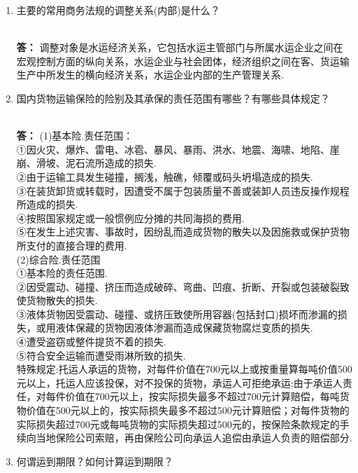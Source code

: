 \documentclass[UTF8]{ctexart}
\date{}
\begin{document}
\thispagestyle{fancy}
\footnotesize
\begin{enumerate}[1]
\item
\begin{CJK}{UTF8}{you}
主要的常用商务法规的调整关系(内部)是什么？
\end{CJK}
\\ \textbf{答：}  调整对象是水运经济关系，它包括水运主管部门与所属水运企业之间在宏观控制方面的纵向关系，水运企业与社会团体，经济组织之间在客、货运输生产中所发生的横向经济关系，水运企业内部的生产管理关系.
\item  \begin{CJK}{UTF8}{you} 国内货物运输保险的险别及其承保的责任范围有哪些？有哪些具体规定？\end{CJK}
\\ \textbf{答：}  (1)基本险.责任范围：
\\ ①因火灾、爆炸、雷电、冰雹、暴风、暴雨、洪水、地震、海啸、地陷、崖崩、滑坡、泥石流所造成的损失.
\\ ②由于运输工具发生碰撞，搁浅，触礁，倾覆或码头坍塌造成的损失.
\\ ③在装货卸货或转载时，因遭受不属于包装质量不善或装卸人员违反操作规程所造成的损失.
\\ ④按照国家规定或一般惯例应分摊的共同海损的费用.
\\ ⑤在发生上述灾害、事故时，因纷乱而造成货物的散失以及因施救或保护货物所支付的直接合理的费用.
\\(2)综合险.责任范围
\\ ①基本险的责任范围.
\\ ②因受震动、碰撞、挤压而造成破碎、弯曲、凹痕、折断、开裂或包装破裂致使货物散失的损失.
\\ ③液体货物因受震动、碰撞、或挤压致使所用容器(包括封口)损坏而渗漏的损失，或用液体保藏的货物因液体渗漏而造成保藏货物腐烂变质的损失.
\\ ④遭受盗窃或整件提货不着的损失.
\\ ⑤符合安全运输而遭受雨淋所致的损失.
\\ 特殊规定:托运人承运的货物，对每件价值在700元以上或按重量算每吨价值500元以上，托运人应该投保，对不投保的货物，承运人可拒绝承运;由于承运人责任，对每件价值在700元以上，按实际损失最多不超过700元计算赔偿，每吨货物价值在500元以上的，按实际损失最多不超过500元计算赔偿；对每件货物的实际损失超过700元或每吨货物的实际损失超过500元的，按保险条款规定的手续向当地保险公司索赔，再由保险公司向承运人追偿由承运人负责的赔偿部分.
\item  \begin{CJK}{UTF8}{you} 何谓运到期限？如何计算运到期限？\end{CJK}

\end{enumerate}
\end{document}
